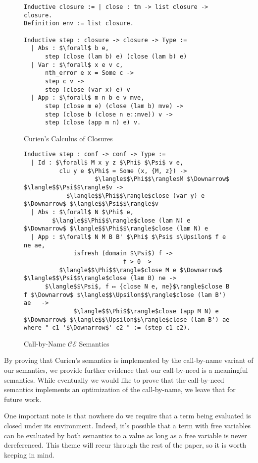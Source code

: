 \begin{figure}
\begin{lstlisting}
Inductive closure := | close : tm -> list closure -> closure. 
Definition env := list closure.

Inductive step : closure -> closure -> Type := 
  | Abs : $\forall$ b e, 
      step (close (lam b) e) (close (lam b) e)
  | Var : $\forall$ x e v c, 
      nth_error e x = Some c -> 
      step c v -> 
      step (close (var x) e) v
  | App : $\forall$ m n b e v mve,
      step (close m e) (close (lam b) mve) ->
      step (close b (close n e::mve)) v ->
      step (close (app m n) e) v.
\end{lstlisting}
\caption{Curien's Calculus of Closures}
\label{fig:curien}
\end{figure}


\begin{figure}
\begin{lstlisting}
Inductive step : conf -> conf -> Type :=
  | Id : $\forall$ M x y z $\Phi$ $\Psi$ v e, 
          clu y e $\Phi$ = Some (x, {M, z}) -> 
                    $\langle$$\Phi$$\rangle$M $\Downarrow$ $\langle$$\Psi$$\rangle$v ->
            $\langle$$\Phi$$\rangle$close (var y) e $\Downarrow$ $\langle$$\Psi$$\rangle$v
  | Abs : $\forall$ N $\Phi$ e, 
        $\langle$$\Phi$$\rangle$close (lam N) e $\Downarrow$ $\langle$$\Phi$$\rangle$close (lam N) e
  | App : $\forall$ N M B B' $\Phi$ $\Psi$ $\Upsilon$ f e ne ae, 
              isfresh (domain $\Psi$) f -> 
                            f > 0 ->
          $\langle$$\Phi$$\rangle$close M e $\Downarrow$ $\langle$$\Psi$$\rangle$close (lam B) ne -> 
      $\langle$$\Psi$, f ↦ {close N e, ne}$\rangle$close B f $\Downarrow$ $\langle$$\Upsilon$$\rangle$close (lam B') ae   ->
              $\langle$$\Phi$$\rangle$close (app M N) e $\Downarrow$ $\langle$$\Upsilon$$\rangle$close (lam B') ae
where " c1 '$\Downarrow$' c2 " := (step c1 c2).
\end{lstlisting}
\caption{Call-by-Name $\mathcal{CE}$ Semantics}
\label{fig:bigstepname}
\end{figure}

By proving that Curien's semantics is implemented by the call-by-name variant of
our semantics, we provide further evidence that our call-by-need is a
meaningful semantics. While eventually we would like to prove that the
call-by-need semantics implements an optimization of the call-by-name, we leave
that for future work.

One important note is that nowhere do we require that a term being evaluated is
closed under its environment. Indeed, it's possible that a term with free variables
can be evaluated by both semantics to a value as long as a free variable is
never dereferenced. This theme will recur through the rest of the paper, so it
is worth keeping in mind.  
